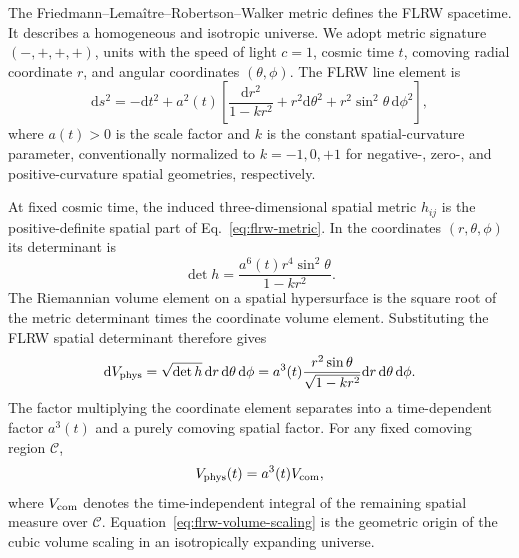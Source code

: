 \documentclass[11pt,a4paper]{article}
\newcommand{\be}{\begin{equation}}
\newcommand{\ee}{\end{equation}}
\newcommand{\lb}[1]{\label{#1}}
\newcommand{\dd}{\mathrm{d}}
\theoremstyle{definition}
\numberwithin{equation}{section}
\begin{document}
The Friedmann--Lema\^itre--Robertson--Walker metric defines the FLRW spacetime. It describes a homogeneous and isotropic universe. We adopt metric signature $(-,+,+,+)$, units with the speed of light $c=1$, cosmic time $t$, comoving radial coordinate $r$, and angular coordinates $(\theta,\phi)$. The FLRW line element is \cite{weinberg2008,dodelson2003,mukhanov2005,peebles1993}
\be
\dd s^2
=
-\dd t^2
+
a^2(t)
\left[
\frac{\dd r^2}{1-kr^2}
+
r^2\dd\theta^2
+
r^2\sin^2\theta\,\dd\phi^2
\right],
\lb{eq:flrw-metric}
\ee
where $a(t)>0$ is the scale factor and $k$ is the constant spatial-curvature parameter, conventionally normalized to $k=-1,0,+1$ for negative-, zero-, and positive-curvature spatial geometries, respectively.

At fixed cosmic time, the induced three-dimensional spatial metric $h_{ij}$ is the positive-definite spatial part of Eq.~\eqref{eq:flrw-metric}. In the coordinates $(r,\theta,\phi)$ its determinant is
\be
\det h
=
\frac{a^6(t)r^4\sin^2\theta}{1-kr^2}.
\lb{eq:flrw-hdet}
\ee
The Riemannian volume element on a spatial hypersurface is the square root of the metric determinant times the coordinate volume element. Substituting the FLRW spatial determinant therefore gives
\be
\dd V_{\rm phys}
=
\sqrt{\det h}\,\dd r\,\dd\theta\,\dd\phi
=
a^3(t)
\frac{r^2\sin\theta}{\sqrt{1-kr^2}}
\dd r\,\dd\theta\,\dd\phi.
\lb{eq:flrw-volume-element}
\ee
The factor multiplying the coordinate element separates into a time-dependent factor $a^3(t)$ and a purely comoving spatial factor. For any fixed comoving region $\mathcal{C}$,
\be
V_{\rm phys}(t)
=
a^3(t)V_{\rm com},
\lb{eq:flrw-volume-scaling}
\ee
where $V_{\rm com}$ denotes the time-independent integral of the remaining spatial measure over $\mathcal{C}$. Equation~\eqref{eq:flrw-volume-scaling} is the geometric origin of the cubic volume scaling in an isotropically expanding universe.
\end{document}
